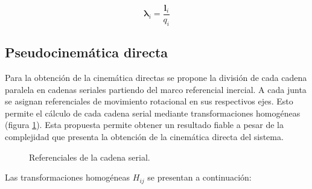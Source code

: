 \begin{equation} \label{eq: vec_U}
\boldsymbol \lambda_i = \frac{\mathbf l_i}{q_i}
\end{equation}

\subsection{Pseudocinemática directa}

Para la obtención de la cinemática directas se propone la división de cada cadena paralela en 
cadenas seriales partiendo del marco referencial inercial.
A cada junta se asignan referenciales de movimiento rotacional  en sus
respectivos ejes.
Esto permite el cálculo de cada cadena serial mediante 
transformaciones homogéneas (figura \ref{fig: cadena serial}).
Esta propuesta permite obtener un resultado fiable a pesar de la 
complejidad que presenta la obtención de la 
cinemática directa del sistema.

\begin{figure}[htb!]
 \centering
 \caption{Referenciales de la cadena serial.}
 \label{fig: cadena serial}
\end{figure}

Las transformaciones homogéneas $H_{ij}$ se presentan a
continuación:

